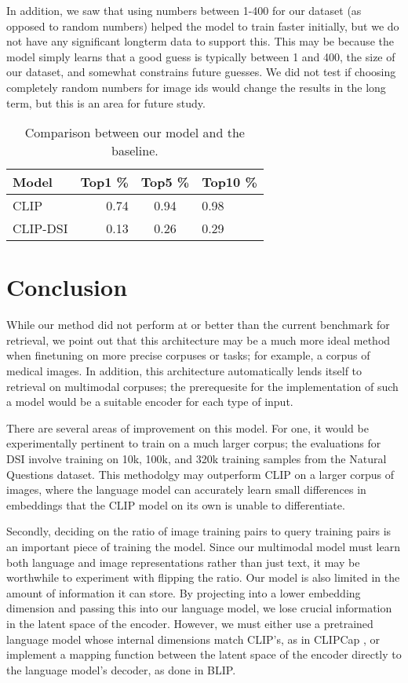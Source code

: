 \documentclass[11pt,a4paper]{article}
\begin{document}
In addition, we saw that using numbers between 1-400 for our dataset (as opposed to random numbers) helped the model to train faster initially, but we do not have any significant longterm data to support this. This may be because the model simply learns that a good guess is typically between 1 and 400, the size of our dataset, and somewhat constrains future guesses. We did not test if choosing completely random numbers for image ids would change the results in the long term, but this is an area for future study.

\begin{table}[t!]
    \begin{center}
    \begin{tabular}{|l|rcl|}
    \hline \textbf{Model} & \textbf{Top1 \%} & \textbf{Top5 \%} & \textbf{Top10 \%} \\ \hline
    CLIP & 0.74 & 0.94 & 0.98 \\
    CLIP-DSI & 0.13 & 0.26 & 0.29 \\
    \hline
    \end{tabular}
    \end{center}
    \caption{\label{results} Comparison between our model and the baseline.}
\end{table}

\section*{Conclusion}

While our method did not perform at or better than the current benchmark for retrieval, we point out that this architecture may be a much more ideal method when finetuning on more precise corpuses or tasks; for example, a corpus of medical images. In addition, this architecture automatically lends itself to retrieval on multimodal corpuses; the prerequesite for the implementation of such a model would be a suitable encoder for each type of input.

There are several areas of improvement on this model. For one, it would be experimentally pertinent to train on a much larger corpus; the evaluations for DSI involve training on 10k, 100k, and 320k training samples from the Natural Questions dataset. This methodolgy may outperform CLIP on a larger corpus of images, where the language model can accurately learn small differences in embeddings that the CLIP model on its own is unable to differentiate.

Secondly, deciding on the ratio of image training pairs to query training pairs is an important piece of training the model. Since our multimodal model must learn both language and image representations rather than just text, it may be worthwhile to experiment with flipping the ratio. Our model is also limited in the amount of information it can store. By projecting into a lower embedding dimension and passing this into our language model, we lose crucial information in the latent space of the encoder. However, we must either use a pretrained language model whose internal dimensions match CLIP's, as in CLIPCap \citep{mokady2021}, or implement a mapping function between the latent space of the encoder directly to the language model's decoder, as done in BLIP.

\end{document}
